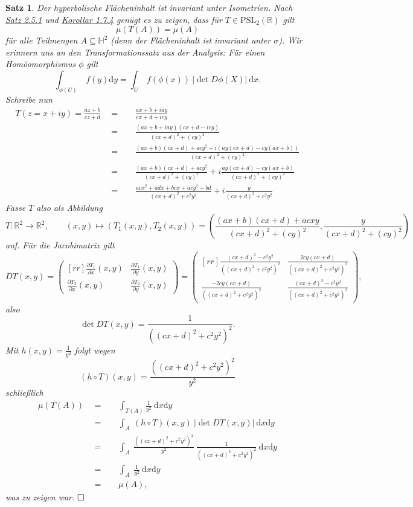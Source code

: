 \documentclass[11pt]{book}
\numberwithin{dummy}{section}
\newtheorem{theorem}{Satz}[section]
\theoremstyle{nonumberbreak}
\newenvironment{pr}[1][]{\ifthenelse{\equal{#1}{}}{\proof}{\proof[#1]}\rm}{\endproof}
\newcommand{\R}{\mathbb{R}}
\newcommand{\He}{\mathbb{H}}
\newcommand{\la}{\longrightarrow}
\begin{document}
\begin{spacing}{1.4}
\begin{theorem}   %
Der hyperbolische Flächeninhalt ist invariant unter Isometrien. 
\begin{pr}
Nach \hyperlink{satzzweifuenfeins}{Satz 2.5.1} und \hyperlink{korollareinssiebenvier}{Korollar 1.7.4} genügt es zu zeigen, dass für $T \in \mathrm{PSL}_2(\R)$ gilt
$$\mu(T(A)) = \mu(A)$$
für alle Teilmengen $A\subseteq \He^2$ (denn der Flächeninhalt ist invariant unter $\sigma$). Wir erinnern uns an den Transformationssatz aus der Analysis: Für einen Homöomorphismus $\phi$ gilt 
$$\int_{\phi(U)} \ f(y) \mathrm{d}y = \int_U \ f(\phi(x)) \ \vert \det D \phi(X) \vert \ \mathrm{d}x.$$
Schreibe nun
\setlength{\abovedisplayskip}{5.5pt}
\setlength{\belowdisplayskip}{5.5pt}
\begin{alignat*}{5}
T(z=x+iy) = \frac{az+b}{cz+d} \ \ &=&& \ \  \frac{ax+b+ iay}{cx+d + icy}\\
&=&&  \ \ \frac{(ax+b+iay)(cx+d-icy)}{(cx+d)^2+(cy)^2}\\
& =&& \  \  \frac{(ax+b)(cx+d) + acy^2 + i (ay (cx+d) - cy(ax+b))}{(cx+d)^2+(cy)^2} \\
&=&& \ \ \frac{(ax+b)(cx+d) + acy^2}{(cx+d)^2+(cy)^2} + i \frac{ay (cx+d) - cy(ax+b)}{(cx+d)^2+(cy)^2}\\
&=&& \ \ \frac{acx^2+adx+bcx+ acy^2+bd}{(cx+d)^2+c^2y^2} + i \frac{y}{(cx+d)^2+c^2y^2}
\end{alignat*}
Fasse $T$ also als Abbildung 
$$T: \R^2 \la \R^2, \qquad (x,y) \mapsto (T_1(x,y), T_2(x,y))= \left( \frac{(ax+b)(cx+d) + acxy}{(cx+d)^2+(cy)^2}, \frac{y}{(cx+d)^2+(cy)^2} \right)$$
auf. Für die Jacobimatrix gilt 
$$D T(x,y) = \begin{pmatrix}[rr] \frac{\partial T_1}{\partial x}(x,y) & \frac{\partial T_1}{\partial y}(x,y) \\[6pt] \frac{\partial T_2}{\partial x}(x,y) & \frac{\partial T_2}{\partial y}(x,y) \end{pmatrix} = \begin{pmatrix}[rr] \frac{(cx+d)^2-c^2y^2}{((cx+d)^2+c^2y^2)^2} & \frac{2cy(cx+d)}{((cx+d)^2+c^2y^2)^2} \\[6pt] \frac{-2cy(cx+d)}{((cx+d)^2+c^2y^2)^2} & \frac{(cx+d)^2-c^2y^2}{((cx+d)^2+c^2y^2)^2} \end{pmatrix},$$
also 
$$\det D T(x,y) = \frac{1}{((cx+d)^2+c^2y^2)^2}.$$
Mit $h(x,y) = \frac{1}{y^2}$ folgt wegen
$$(h \circ T)(x,y) = \frac{((cx+d)^2+c^2y^2)^2}{y^2}$$
schließlich
\setlength{\abovedisplayskip}{5.5pt}
\setlength{\belowdisplayskip}{5.5pt}
\begin{alignat*}{5}
\mu(T(A)) \ \ &=&& \ \ \int_{T(A)} \frac{1}{y^2} \ \mathrm{d}x \mathrm{d}y \\
&=&& \ \  \int_A\ (h \circ T)(x,y) \ \vert \det D T(x,y)\vert \ \mathrm{d}x \mathrm{d}y \\
&=&& \ \  \int_A \ \frac{((cx+d)^2+c^2y^2)^2}{y^2} \ \frac{1}{((cx+d)^2+c^2y^2)^2} \ \mathrm{d}x \mathrm{d}y \\
&=&& \ \ \int_A \ \frac{1}{y^2}\ \mathrm{d}x \mathrm{d}y\\
&=&& \ \ \mu(A),
\end{alignat*}
was zu zeigen war. $\hfill \Box$
\end{pr}



\end{theorem}
\end{spacing}
\end{document}
